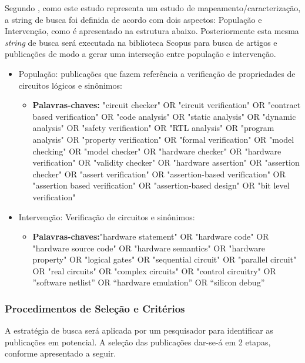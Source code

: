 Segundo \citeauthor{rocha2015verificaccao}, como este estudo representa um estudo de mapeamento/caracterização, a string de busca foi definida de acordo com dois aspectos: População e Intervenção, como é apresentado na estrutura abaixo. Posteriormente esta mesma \textit{string} de busca será executada na biblioteca Scopus para busca de artigos e publicações de modo a gerar uma interseção entre população e intervenção.
\begin{itemize}
\item População: publicações que fazem referência a verificação de propriedades de circuitos lógicos e sinônimos:
	\begin{itemize}
	\item \textbf{Palavras-chaves:} "circuit checker" OR "circuit verification" OR "contract based verification" OR "code analysis" OR "static analysis" OR "dynamic analysis" OR "safety verification" OR "RTL analysis" OR "program analysis" OR "property verification" OR "formal verification" OR "model checking" OR "model checker" OR "hardware checker" OR "hardware verification" OR "validity checker" OR "hardware assertion" OR "assertion checker" OR "assert verification" OR "assertion-based verification" OR "assertion based verification" OR "assertion-based design" OR "bit level verification"
	\end{itemize}
\item Intervenção: Verificação de circuitos e sinônimos:
	\begin{itemize}
	\item \textbf{Palavras-chaves:}"hardware statement" OR "hardware code" OR "hardware source code" OR "hardware semantics" OR "hardware property" OR "logical gates" OR "sequential circuit" OR "parallel circuit" OR "real circuits" OR "complex circuits" OR "control circuitry" OR ”software netlist” OR “hardware emulation” OR “silicon debug”
	\end{itemize}
\end{itemize}


\subsubsection{Procedimentos de Seleção e Critérios}

A estratégia de busca será aplicada por um pesquisador para identificar as publicações em potencial. A seleção das publicações dar-se-á em 2 etapas, conforme apresentado a seguir.

